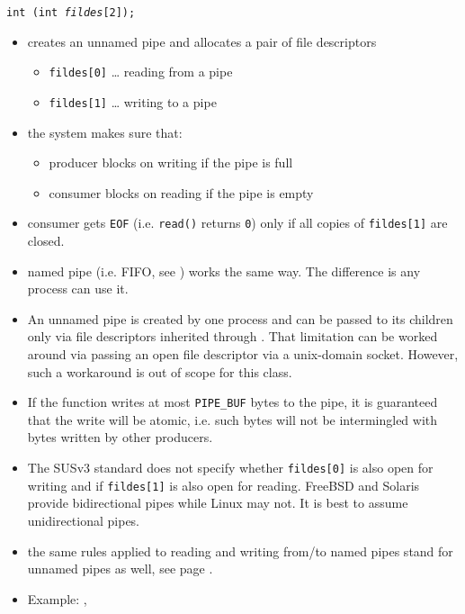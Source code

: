 \begin{slide}
\texttt{int (int \emph{fildes}[2]);}
\begin{itemize}
\item creates an unnamed pipe and allocates a pair of file descriptors
    \begin{itemize}
    \item \texttt{fildes[0]} \dots{} reading from a pipe
    \item \texttt{fildes[1]} \dots{} writing to a pipe
    \end{itemize}
\item the system makes sure that:
    \begin{itemize}
    \item producer blocks on writing if the pipe is full
    \item consumer blocks on reading if the pipe is empty
    \end{itemize}
\item consumer gets \texttt{EOF} (i.e. \texttt{read()} returns
\texttt{0}) only if all copies of \texttt{fildes[1]} are closed.
\item named pipe (i.e. FIFO, see ) works the same way.  The
difference is any process can use it.
\end{itemize}
\end{slide}

\label{PIPE}

\begin{itemize}
\item An unnamed pipe is created by one process and can be passed to its
children only via file descriptors inherited through .  That
limitation can be worked around via passing an open file descriptor via a
u{}nix-domain socket.  However, such a workaround is out of scope for this
class.
\item If the function  writes at most \texttt{PIPE\_BUF} bytes to
the pipe, it is guaranteed that the write will be atomic, i.e. such bytes will
not be intermingled with bytes written by other producers.
\item \label{TWO_WAY_PIPES} The SUSv3 standard does not specify whether
\texttt{fildes[0]} is also open for writing and if \texttt{fildes[1]} is also
open for reading.  FreeBSD and Solaris provide bidirectional pipes while Linux
may not.  It is best to assume unidirectional pipes.
\item {} the same rules applied to reading and writing from/to
named pipes stand for unnamed pipes as well, see page \pageref{NAMEDPIPE}.
\item Example: , 
\end{itemize}

